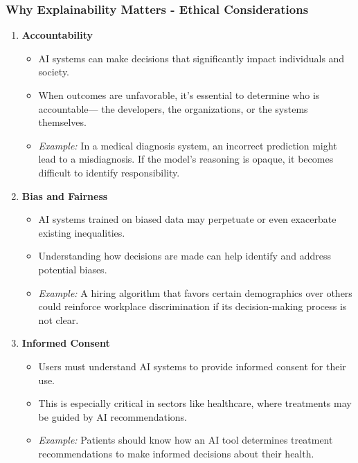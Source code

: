 \documentclass[aspectratio=169]{beamer}
\begin{document}
\begin{frame}[fragile]
    \frametitle{Why Explainability Matters - Ethical Considerations}
    \begin{enumerate}
        \item \textbf{Accountability}
        \begin{itemize}
            \item AI systems can make decisions that significantly impact individuals and society. 
            \item When outcomes are unfavorable, it's essential to determine who is accountable— the developers, the organizations, or the systems themselves.
            \item \textit{Example:} In a medical diagnosis system, an incorrect prediction might lead to a misdiagnosis. If the model’s reasoning is opaque, it becomes difficult to identify responsibility.
        \end{itemize}
        
        \item \textbf{Bias and Fairness}
        \begin{itemize}
            \item AI systems trained on biased data may perpetuate or even exacerbate existing inequalities. 
            \item Understanding how decisions are made can help identify and address potential biases.
            \item \textit{Example:} A hiring algorithm that favors certain demographics over others could reinforce workplace discrimination if its decision-making process is not clear.
        \end{itemize}
        
        \item \textbf{Informed Consent}
        \begin{itemize}
            \item Users must understand AI systems to provide informed consent for their use.
            \item This is especially critical in sectors like healthcare, where treatments may be guided by AI recommendations.
            \item \textit{Example:} Patients should know how an AI tool determines treatment recommendations to make informed decisions about their health.
        \end{itemize}
    \end{enumerate}
\end{frame}
\end{document}
